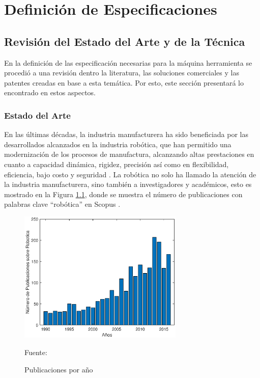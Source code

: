 \chapter{Definición de Especificaciones}

\section{Revisión del Estado del Arte y de la Técnica}
En la definición de las especificación necesarias para la máquina herramienta se procedió a una revisión dentro la literatura, las soluciones comerciales y las patentes creadas en base a esta temática. Por esto, este sección presentará lo encontrado en estos aspectos.

\subsection{Estado del Arte}
En las últimas décadas, la industria manufacturera ha sido beneficiada por las desarrollados alcanzados en la industria robótica, que han permitido una modernización de los procesos de manufactura, alcanzando altas prestaciones en cuanto a capacidad dinámica, rigidez, precisión \citep{serje2017parallel} así como en flexibilidad, eficiencia, bajo costo y seguridad \citep{yuan2018review,stipanvcic2012programming,vsvaco2014calibration}. La robótica no solo ha llamado la atención de la industria manufacturera, sino también a investigadores y académicos, esto es mostrado en la Figura \ref{fig:PublicacionesPorAnio}, donde se muestra el número de publicaciones con palabras clave “robótica” en Scopus \citep{yuan2018review}.

\begin{figure}[ht!]
    \centering
    \includegraphics[width=0.7\textwidth]{Cap2_DisenoEspecificaciones/Figura/PublicacionesPorAnio.eps}
    \caption{Publicaciones por año}{Fuente:\citep{yuan2018review}}
    \label{fig:PublicacionesPorAnio}
\end{figure}

